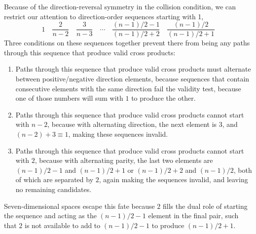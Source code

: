 \documentclass[11pt]{article}
\begin{document}
Because of the direction-reversal symmetry in the collision condition, we can restrict our attention to direction-order sequences starting with 1,
%
\begin{equation}
1\hspace{1em}\frac{2}{n-2} \hspace{1em} \frac{3}{n-3}\hspace{1em} \cdots \hspace{1em} \frac{(n-1)/2 -1}{(n-1)/2 +2} \hspace{1em} \frac{(n-1)/2}{(n-1)/2 +1}
\end{equation}
Three conditions on these sequences together prevent there from being any paths through this sequence that produce valid cross products: 
\begin{enumerate}
\item Paths through this sequence that produce valid cross products must alternate between positive/negative direction elements, because sequences that contain consecutive elements with the same direction fail the validity test, because one of those numbers will sum with $1$ to produce the other. \item Paths through this sequence that produce valid cross products cannot start with $n-2$, because with alternating direction, the next element is $3$, and  $(n-2)+3 \equiv 1$, making these sequences invalid.
\item Paths through this sequence that produce valid cross products cannot start with $2$, because with alternating parity, the last two elements are 
$(n-1)/2 -1$ and $(n-1)/2 +1$ or $(n-1)/2 +2 $ and $(n-1)/2$, both of which are separated by $2$, again making the sequences invalid, and leaving no remaining candidates.
\end{enumerate}
Seven-dimensional spaces escape this fate because $2$ fills the dual role of starting the sequence and acting as the $(n-1)/2 -1$ element in the final pair, such that $2$ is not available to add to $(n-1)/2 -1$ to produce $(n-1)/2 + 1$.
\end{document}
